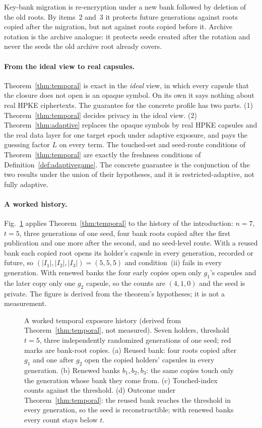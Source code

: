 \documentclass[pdflatex,sn-mathphys-num]{sn-jnl}%
\theoremstyle{plain}
\theoremstyle{definition}
\begin{document}
Key-bank migration is re-encryption under a new bank followed by deletion of the old roots. By items~2 and~3 it protects future generations against roots copied after the migration, but not against roots copied before it. Archive rotation is the archive analogue: it protects seeds created after the rotation and never the seeds the old archive root already covers.

\paragraph{From the ideal view to real capsules.}
Theorem~\ref{thm:temporal} is exact in the \emph{ideal} view, in which every capsule that the closure does not open is an opaque symbol. On its own it says nothing about real HPKE ciphertexts. The guarantee for the concrete profile has two parts. (1) Theorem~\ref{thm:temporal} decides privacy in the ideal view. (2) Theorem~\ref{thm:adaptive} replaces the opaque symbols by real HPKE capsules and the real data layer for one target epoch under adaptive exposure, and pays the guessing factor $L$ on every term. The touched-set and seed-route conditions of Theorem~\ref{thm:temporal} are exactly the freshness conditions of Definition~\ref{def:adaptivegame}. The concrete guarantee is the conjunction of the two results under the union of their hypotheses, and it is restricted-adaptive, not fully adaptive.

\paragraph{A worked history.}
Fig.~\ref{fig:worked} applies Theorem~\ref{thm:temporal} to the history of the introduction: $n=7$, $t=5$, three generations of one seed, four bank roots copied after the first publication and one more after the second, and no seed-level route. With a reused bank each copied root opens its holder's capsule in every generation, recorded or future, so $(|I_1|,|I_2|,|I_3|)=(5,5,5)$ and condition~(ii) fails in every generation. With renewed banks the four early copies open only $g_1$'s capsules and the later copy only one $g_2$ capsule, so the counts are $(4,1,0)$ and the seed is private. The figure is derived from the theorem's hypotheses; it is not a measurement.

\begin{figure}[t]
\centering
\figbox{}
\caption{A worked temporal exposure history (derived from Theorem~\ref{thm:temporal}, not measured). Seven holders, threshold $t=5$, three independently randomized generations of one seed; red marks are bank-root copies. (a) Reused bank: four roots copied after $g_1$ and one after $g_2$ open the copied holders' capsules in every generation. (b) Renewed banks $b_1,b_2,b_3$: the same copies touch only the generation whose bank they come from. (c) Touched-index counts against the threshold. (d) Outcome under Theorem~\ref{thm:temporal}: the reused bank reaches the threshold in every generation, so the seed is reconstructible; with renewed banks every count stays below $t$.}\label{fig:worked}
\end{figure}
\end{document}
